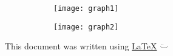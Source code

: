 \documentclass[11pt, twoside]{article}
\begin{document}
\begin{figure}[H]
	\begin{subfigure}{.5\textwidth}
	  \raggedright
	  \texttt{[image: graph1]} 
	\end{subfigure}
	\begin{subfigure}{.5\textwidth}
	  \raggedleft
	  \texttt{[image: graph2]} 
	\end{subfigure}

\end{figure}

\vfill
\begin{flushright} \tiny This document was written using \href{http://www.latex-project.org/}{\LaTeX} $\ddot\smile$ 
\end{flushright}
\end{document}
